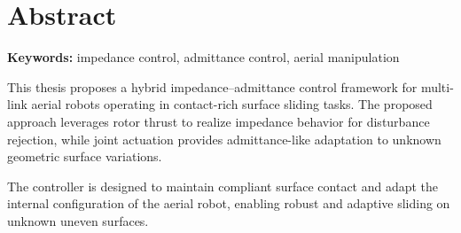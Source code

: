 ﻿\chapter*{Abstract}
\thispagestyle{empty}

\normalsize
\textbf{Keywords:} impedance control, admittance control, aerial manipulation

This thesis proposes a hybrid impedance–admittance control framework for multi-link aerial robots operating in contact-rich surface sliding tasks. The proposed approach leverages rotor thrust to realize impedance behavior for disturbance rejection, while joint actuation provides admittance-like adaptation to unknown geometric surface variations.

\vspace{3mm}
 The controller is designed to maintain compliant surface contact and adapt the internal configuration of the aerial robot, enabling robust and adaptive sliding on unknown uneven surfaces.

